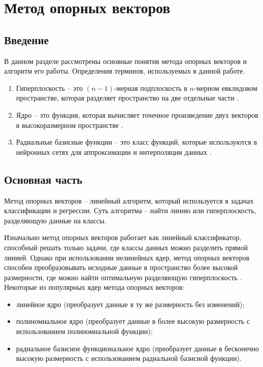 \chapter{Метод опорных векторов}
\section*{Введение}
В данном разделе рассмотрены основные понятия метода опорных векторов и алгоритм его работы. 
Определения терминов, используемых в данной работе.
\begin{enumerate}[label=\arabic*.]
	\item Гиперплоскость – это $(n-1)$-мерная подплоскость в $n$-мерном евклидовом пространстве, которая разделяет пространство на две отдельные части \cite{hyperploskostb}.
	\item Ядро – это функция, которая вычисляет точечное произведение двух векторов в высокоразмерном пространстве \cite{kernel}.
	\item Радиальные базисные функции – это класс функций, которые используются в нейронных сетях для аппроксимации и интерполяции данных \cite{rbf}.
\end{enumerate}

\section*{Основная часть}

Метод опорных векторов – линейный алгоритм, который используется в задачах классификации и регрессии. 
Суть алгоритма – найти линию или гиперплоскость, разделяющую данные на классы.

Изначально метод опорных векторов работает как линейный классификатор, способный решать только задачи, где классы данных можно разделить прямой линией. 
Однако при использовании нелинейных ядер, метод опорных векторов способен преобразовывать исходные данные в пространство более высокой размерности, где можно найти оптимальную разделяющую гиперплоскость \cite{all}. 
Некоторые из популярных ядер метода опорных векторов:
\begin{itemize}
	\item линейное ядро (преобразует данные в ту же размерность без изменений);
	\item полиномиальное ядро (преобразует данные в более высокую размерность с использованием полиномиальной функции);
	\item радиальное базисное функциональное ядро (преобразует данные в бесконечно высокую размерность с использованием радиальной базисной функции).
\end{itemize}

